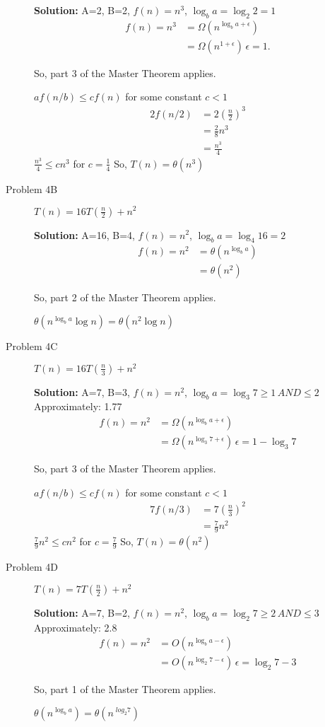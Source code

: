 \documentclass[12pt]{article}
\begin{document}
\begin{description}
\smallskip
\textbf{Solution:} A=2, B=2, \( f(n)=n^3 \), \( \log_b a = \log_2 2 = 1 \)
\begin{align*}
f(n)= n^3 & = \Omega(n^{\log_b a + \epsilon})\\
          & = \Omega(n^{1 + \epsilon})\, \epsilon = 1.
\end{align*}

So, part 3 of the Master Theorem applies.

\(af(n/b) \leq cf(n) \) for some constant $c<1$
\begin{align*}
2f(n/2) & = 2(\frac{n}{2})^3\\
        & = \frac{2}{8}n^3\\
        & = \frac{n^3}{4}
\end{align*}
\( \frac{n^3}{4} \leq cn^3 \) for \(c = \frac{1}{4} \) So, $T(n) = \theta(n^3)$
\smallskip
\item[Problem 4B] \( T(n)=16T(\frac{n}{2})+n^2 \)

\smallskip
\textbf{Solution:} A=16, B=4, \( f(n)=n^2 \), \( \log_b a = \log_4 16 = 2 \)
\begin{align*}
f(n)= n^2 & = \theta(n^{\log_b a})\\
          & = \theta(n^2)
\end{align*}

So, part 2 of the Master Theorem applies.

$\theta(n^{\log_b a} \log n) = \theta(n^2 \log n)$
\smallskip
\item[Problem 4C] \( T(n)=16T(\frac{n}{3})+n^2 \)

\smallskip
\textbf{Solution:} A=7, B=3, \( f(n)=n^2 \), \( \log_b a = \log_3 7 \geq 1\, AND \leq 2 \) Approximately: 1.77 
\begin{align*}
f(n)= n^2 & = \Omega(n^{\log_b a + \epsilon})\\
          & = \Omega(n^{\log_3 7 + \epsilon})\, \epsilon = 1-\log_3 7
\end{align*}

So, part 3 of the Master Theorem applies.

\(af(n/b) \leq cf(n) \) for some constant $c<1$
\begin{align*}
7f(n/3) & = 7(\frac{n}{3})^2\\
        & = \frac{7}{9}n^2
\end{align*}
\( \frac{7}{9}n^2 \leq cn^2 \) for \(c = \frac{7}{9} \) So, $T(n) = \theta(n^2)$
\smallskip
\item[Problem 4D] \( T(n)=7T(\frac{n}{2})+n^2 \)

\smallskip
\textbf{Solution:} A=7, B=2, \( f(n)=n^2 \), \( \log_b a = \log_2 7 \geq 2\, AND \leq 3 \) Approximately: 2.8
\begin{align*}
f(n)= n^2 & = O(n^{\log_b a - \epsilon})\\
          & = O(n^{\log_2 7 - \epsilon})\, \epsilon = \log_2 7 - 3
\end{align*}

So, part 1 of the Master Theorem applies.

$\theta(n^{\log_b a}) = \theta(n^{\;log_2 7})$
\end{description}
\end{document}
